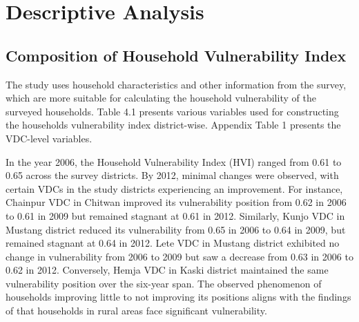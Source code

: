 \section{Descriptive Analysis} \label{isect3}
\subsection{Composition of Household Vulnerability Index}
The study uses household characteristics and other information from
the survey, which are more suitable for calculating the household vulnerability of the surveyed households. Table 4.1 presents various variables used for constructing the households vulnerability index district-wise. Appendix Table 1 presents the VDC-level variables.   

In the year 2006, the Household Vulnerability Index (HVI) ranged from 0.61 to 0.65 across the survey districts. By 2012, minimal changes were observed, with certain VDCs in the study districts experiencing an improvement. For instance, Chainpur VDC in Chitwan improved its vulnerability position from 0.62 in 2006 to 0.61 in 2009 but remained stagnant at 0.61 in 2012. Similarly, Kunjo VDC in Mustang district reduced its vulnerability from 0.65 in 2006 to 0.64 in 2009, but remained stagnant at 0.64 in 2012. Lete VDC in Mustang district exhibited no change in vulnerability from 2006 to 2009 but saw a decrease from 0.63 in 2006 to 0.62 in 2012. Conversely, Hemja VDC in Kaski district maintained the same vulnerability position over the six-year span. The observed phenomenon of households improving little to not improving its positions aligns with the findings of \cite{acharya2008dimension} that households in rural areas face significant vulnerability.\par 
